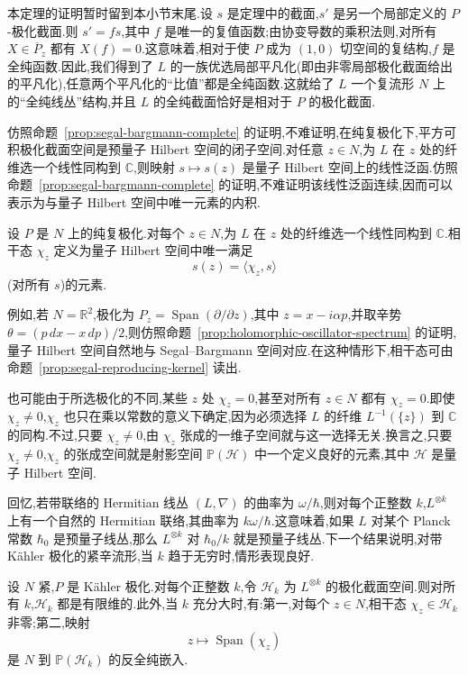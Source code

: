 本定理的证明暂时留到本小节末尾.设 $s$ 是定理中的截面,$s'$ 是另一个局部定义的 $P$-极化截面.则 $s'=fs$,其中 $f$ 是唯一的复值函数;由协变导数的乘积法则,对所有 $X\in\overline P_z$ 都有 $X(f)=0$.这意味着,相对于使 $P$ 成为 $(1,0)$ 切空间的复结构,$f$ 是全纯函数.因此,我们得到了 $L$ 的一族优选局部平凡化(即由非零局部极化截面给出的平凡化),任意两个平凡化的“比值”都是全纯函数.这就给了 $L$ 一个复流形 $N$ 上的“全纯线丛”结构,并且 $L$ 的全纯截面恰好是相对于 $P$ 的极化截面.

仿照命题~\ref{prop:segal-bargmann-complete} 的证明,不难证明,在纯复极化下,平方可积极化截面空间是预量子 Hilbert 空间的闭子空间.对任意 $z\in N$,为 $L$ 在 $z$ 处的纤维选一个线性同构到 $\mathbb C$,则映射 $s\mapsto s(z)$ 是量子 Hilbert 空间上的线性泛函.仿照命题~\ref{prop:segal-bargmann-complete} 的证明,不难证明该线性泛函连续,因而可以表示为与量子 Hilbert 空间中唯一元素的内积.

\begin{definition}[相干态]
\label{def:coherent-state}
设 $P$ 是 $N$ 上的纯复极化.对每个 $z\in N$,为 $L$ 在 $z$ 处的纤维选一个线性同构到 $\mathbb C$.相干态 $\chi_z$ 定义为量子 Hilbert 空间中唯一满足
\[
 s(z)=\langle\chi_z,s\rangle
\]
(对所有 $s$)的元素.
\end{definition}

例如,若 $N=\mathbb R^2$,极化为 $P_z=\operatorname{Span}(\partial/\partial z)$,其中 $z=x-i\alpha p$,并取辛势 $\theta=(p\,dx-x\,dp)/2$,则仿照命题~\ref{prop:holomorphic-oscillator-spectrum} 的证明,量子 Hilbert 空间自然地与 Segal--Bargmann 空间对应.在这种情形下,相干态可由命题~\ref{prop:segal-reproducing-kernel} 读出.

也可能由于所选极化的不同,某些 $z$ 处 $\chi_z=0$,甚至对所有 $z\in N$ 都有 $\chi_z=0$.即使 $\chi_z\ne0$,$\chi_z$ 也只在乘以常数的意义下确定,因为必须选择 $L$ 的纤维 $L^{-1}(\{z\})$ 到 $\mathbb C$ 的同构.不过,只要 $\chi_z\ne0$,由 $\chi_z$ 张成的一维子空间就与这一选择无关.换言之,只要 $\chi_z\ne0$,$\chi_z$ 的张成空间就是射影空间 $\mathbb P(\mathcal H)$ 中一个定义良好的元素,其中 $\mathcal H$ 是量子 Hilbert 空间.

回忆,若带联络的 Hermitian 线丛 $(L,\nabla)$ 的曲率为 $\omega/\hbar$,则对每个正整数 $k$,$L^{\otimes k}$ 上有一个自然的 Hermitian 联络,其曲率为 $k\omega/\hbar$.这意味着,如果 $L$ 对某个 Planck 常数 $\hbar_0$ 是预量子线丛,那么 $L^{\otimes k}$ 对 $\hbar_0/k$ 就是预量子线丛.下一个结果说明,对带 Kähler 极化的紧辛流形,当 $k$ 趋于无穷时,情形表现良好.

\begin{theorem}
\label{thm:kahler-quantization-finite}
设 $N$ 紧,$P$ 是 Kähler 极化.对每个正整数 $k$,令 $\mathcal H_k$ 为 $L^{\otimes k}$ 的极化截面空间.则对所有 $k$,$\mathcal H_k$ 都是有限维的.此外,当 $k$ 充分大时,有:第一,对每个 $z\in N$,相干态 $\chi_z\in\mathcal H_k$ 非零;第二,映射
\[
 z\longmapsto\operatorname{Span}(\chi_z)
\]
是 $N$ 到 $\mathbb P(\mathcal H_k)$ 的反全纯嵌入.
\end{theorem}

